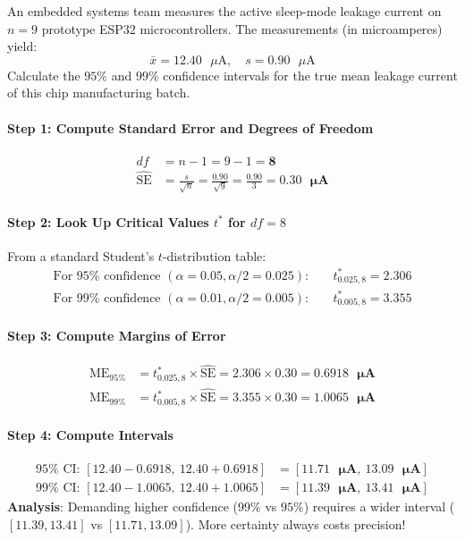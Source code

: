 \begin{example}
An embedded systems team measures the active sleep-mode leakage current on $n = 9$ prototype ESP32 microcontrollers. The measurements (in microamperes) yield:
\begin{equation*}
\bar{x} = 12.40\text{ }\mu\text{A}, \quad s = 0.90\text{ }\mu\text{A}
\end{equation*}
Calculate the $95\%$ and $99\%$ confidence intervals for the true mean leakage current of this chip manufacturing batch.

\paragraph{Step 1: Compute Standard Error and Degrees of Freedom}
\begin{align*}
df &= n - 1 = 9 - 1 = \mathbf{8} \\
\widehat{\text{SE}} &= \frac{s}{\sqrt{n}} = \frac{0.90}{\sqrt{9}} = \frac{0.90}{3} = \mathbf{0.30\text{ }\mu\text{A}}
\end{align*}

\paragraph{Step 2: Look Up Critical Values $t^*$ for $df = 8$}
From a standard Student's $t$-distribution table:
\begin{align*}
\text{For } 95\%\text{ confidence } (\alpha = 0.05, \alpha/2 = 0.025): &\quad t_{0.025, 8}^* = \mathbf{2.306} \\
\text{For } 99\%\text{ confidence } (\alpha = 0.01, \alpha/2 = 0.005): &\quad t_{0.005, 8}^* = \mathbf{3.355}
\end{align*}

\paragraph{Step 3: Compute Margins of Error}
\begin{align*}
\text{ME}_{95\%} &= t_{0.025, 8}^* \times \widehat{\text{SE}} = 2.306 \times 0.30 = \mathbf{0.6918\text{ }\mu\text{A}} \\
\text{ME}_{99\%} &= t_{0.005, 8}^* \times \widehat{\text{SE}} = 3.355 \times 0.30 = \mathbf{1.0065\text{ }\mu\text{A}}
\end{align*}

\paragraph{Step 4: Compute Intervals}
\begin{align*}
95\%\text{ CI: } [12.40 - 0.6918, \ 12.40 + 0.6918] &= [\mathbf{11.71\text{ }\mu\text{A}}, \ \mathbf{13.09\text{ }\mu\text{A}}] \\
99\%\text{ CI: } [12.40 - 1.0065, \ 12.40 + 1.0065] &= [\mathbf{11.39\text{ }\mu\text{A}}, \ \mathbf{13.41\text{ }\mu\text{A}}]
\end{align*}
\textbf{Analysis}: Demanding higher confidence ($99\%$ vs $95\%$) requires a wider interval ($[11.39, 13.41]$ vs $[11.71, 13.09]$). More certainty always costs precision!
\end{example}

